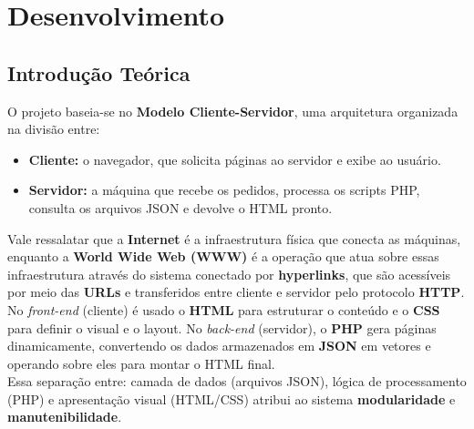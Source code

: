 \documentclass[12pt,a4paper]{article}
\begin{document}
\section{Desenvolvimento}

\subsection{Introdução Teórica}

O projeto baseia-se no \textbf{Modelo Cliente-Servidor}, uma arquitetura organizada na divisão entre:
\begin{itemize}
    \item \textbf{Cliente:} o navegador, que solicita páginas ao servidor e exibe ao usuário.
    \item \textbf{Servidor:} a máquina que recebe os pedidos, processa os scripts PHP, consulta os arquivos JSON e devolve o HTML pronto.
\end{itemize}

\newpage

Vale ressalatar que a \textbf{Internet} é a infraestrutura física que conecta as máquinas, enquanto a \textbf{World Wide Web (WWW)} é a operação que atua sobre essas infraestrutura através do sistema conectado por \textbf{hyperlinks}, que são acessíveis por meio das \textbf{URLs} e transferidos entre cliente e servidor pelo protocolo \textbf{HTTP}.\\

No \textit{front-end} (cliente) é usado o \textbf{HTML} para estruturar o conteúdo e o \textbf{CSS} para definir o visual e o layout. No \textit{back-end} (servidor), o \textbf{PHP} gera páginas dinamicamente, convertendo os dados armazenados em \textbf{JSON} em vetores e operando sobre eles para montar o HTML final.\\

Essa separação entre: camada de dados (arquivos JSON), lógica de processamento (PHP) e apresentação visual (HTML/CSS) atribui ao sistema \textbf{modularidade} e \textbf{manutenibilidade}.




\end{document}
